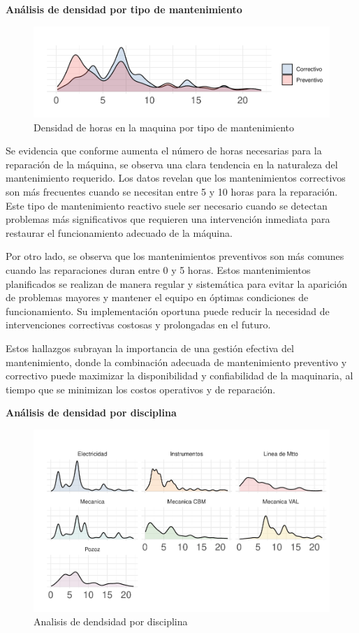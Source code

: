 \documentclass[
  11pt,
  bookmarksnumbered]{article}
\begin{document}
\textbf{Análisis de densidad por tipo de mantenimiento}

\begin{figure}
\centering
\includegraphics{trabajo_files/figure-latex/unnamed-chunk-17-1.pdf}
\caption{\label{fig:unnamed-chunk-17}Densidad de horas en la maquina por tipo de mantenimiento}
\end{figure}

Se evidencia que conforme aumenta el número de horas necesarias para la reparación de la máquina, se observa una clara tendencia en la naturaleza del mantenimiento requerido.
Los datos revelan que los mantenimientos correctivos son más frecuentes cuando se necesitan entre 5 y 10 horas para la reparación.
Este tipo de mantenimiento reactivo suele ser necesario cuando se detectan problemas más significativos que requieren una intervención inmediata para restaurar el funcionamiento adecuado de la máquina.

Por otro lado, se observa que los mantenimientos preventivos son más comunes cuando las reparaciones duran entre 0 y 5 horas.
Estos mantenimientos planificados se realizan de manera regular y sistemática para evitar la aparición de problemas mayores y mantener el equipo en óptimas condiciones de funcionamiento.
Su implementación oportuna puede reducir la necesidad de intervenciones correctivas costosas y prolongadas en el futuro.

Estos hallazgos subrayan la importancia de una gestión efectiva del mantenimiento, donde la combinación adecuada de mantenimiento preventivo y correctivo puede maximizar la disponibilidad y confiabilidad de la maquinaria, al tiempo que se minimizan los costos operativos y de reparación.

\textbf{Análisis de densidad por disciplina}

\begin{figure}
\centering
\includegraphics{trabajo_files/figure-latex/unnamed-chunk-18-1.pdf}
\caption{\label{fig:unnamed-chunk-18}Analisis de dendsidad por disciplina}
\end{figure}
\end{document}
